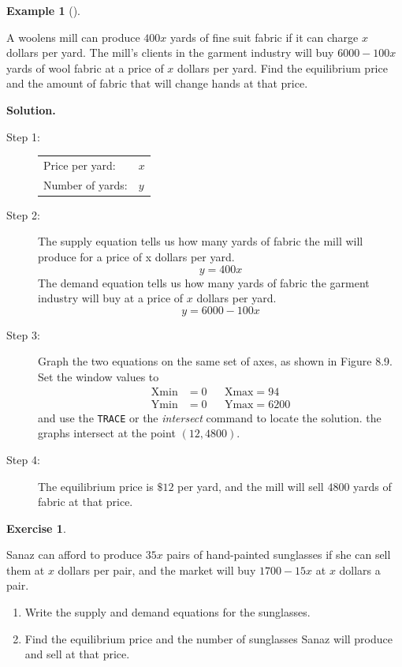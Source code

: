 \documentclass[10pt,]{book}
\theoremstyle{plain}
\theoremstyle{definition}
\theoremstyle{definition}
\newtheorem{example}[theorem]{Example}
\theoremstyle{definition}
\theoremstyle{definition}
\newtheorem{exercise}[theorem]{Exercise}
\numberwithin{equation}{section}
\newcommand{\amp}{ & }
\begin{document}
\begin{example}[]\label{example-9}

		A woolens mill can produce \(400x\) yards of fine suit fabric if it can charge \(x\) dollars per yard. The mill's clients in the garment industry will buy \(6000 − 100x\) yards of wool fabric at a price of \(x\) dollars per yard. Find the equilibrium price and the amount of fabric that will change hands at that price.
\par\medskip\noindent%
\textbf{Solution.}\quad 
		\leavevmode%
\begin{description}
\item[Step 1:]{}
				\begin{tabular}{ll}

							Price per yard:
&\(x\)\tabularnewline[0pt]
Number of yards:%
&\(y\)
\end{tabular}

\item[Step 2:]{}
				The supply equation tells us how many yards of fabric the mill will produce for a price of x dollars per yard.
				\begin{equation*}y=400x\end{equation*}
				The demand equation tells us how many yards of fabric the garment industry will buy at a price of \(x\) dollars per yard.
				\begin{equation*}y = 6000 − 100x\end{equation*}
\item[Step 3:]{}
				Graph the two equations on the same set of axes, as shown in Figure 8.9. Set the window values to
				\begin{align*}

						\text{Xmin} \amp = 0 \amp\amp \text{Xmax} = 94
					\\

						\text{Ymin} \amp = 0 \amp\amp \text{Ymax} = 6200
					
\end{align*}
				and use the \lstinline?TRACE? or the \emph{intersect} command to locate the solution. the graphs intersect at the point \((12, 4800)\).
\item[Step 4:]{}
				The equilibrium price is \(\$12\) per yard, and the mill will sell \(4800\) yards of fabric at that price.
\end{description}

\end{example}
\begin{exercise}\label{exercise-9}

		Sanaz can afford to produce \(35x\) pairs of hand-painted sunglasses if she can sell them at \(x\) dollars per pair, and the market will buy \(1700 - 15x\) at \(x\) dollars a pair.
		\leavevmode%
\begin{enumerate}[label=*\alph**]
\item\hypertarget{li-54}{}
				Write the supply and demand equations for the sunglasses.
\item\hypertarget{li-55}{}
				Find the equilibrium price and the number of sunglasses Sanaz will produce and sell at that price.
\end{enumerate}

\end{exercise}
\end{document}
